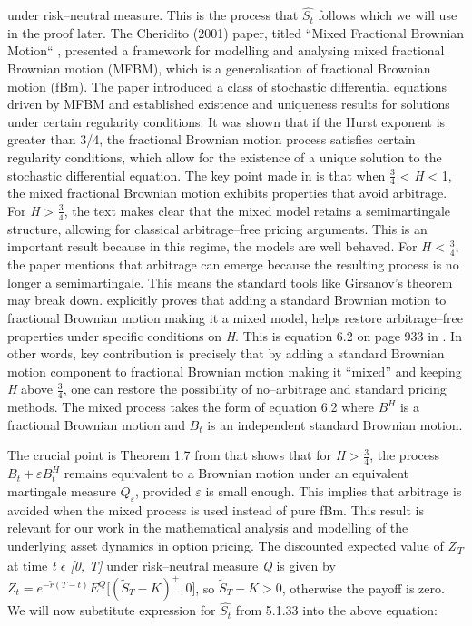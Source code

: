 \documentclass[12pt,a4paper]{report}
\numberwithin{equation}{section}
\begin{document}
under risk--neutral measure. This is the process that \(\widehat{S_{t}}\)
follows which we will use in the proof later. The Cheridito (2001)
paper, titled ``Mixed Fractional Brownian Motion`` \cite{cheridito2001mixed_107}, presented a
framework for modelling and analysing mixed fractional Brownian motion
(MFBM), which is a generalisation of fractional Brownian motion (fBm).
The paper introduced a class of stochastic differential equations driven
by MFBM and established existence and uniqueness results for solutions
under certain regularity conditions. It was shown that if the Hurst
exponent is greater than 3/4, the fractional Brownian motion process
satisfies certain regularity conditions, which allow for the existence
of a unique solution to the stochastic differential equation. The key
point made in \cite{cheridito2001mixed_107} is that when $\frac{3}{4}$ \textless{} \emph{H} \textless{}
1, the mixed fractional Brownian motion exhibits properties that avoid
arbitrage. For \emph{H} \textgreater{} $\frac{3}{4}$, the text makes clear that the
mixed model retains a semimartingale structure, allowing for classical
arbitrage--free pricing arguments. This is an important result because in
this regime, the models are well behaved. For \emph{H} \textless{} $\frac{3}{4}$,
the paper mentions that arbitrage can emerge because the resulting
process is no longer a semimartingale. This means the standard tools
like Girsanov's theorem may break down. \cite{cheridito2001mixed_107} explicitly proves that
adding a standard Brownian motion to fractional Brownian motion making
it a mixed model, helps restore arbitrage--free properties under specific
conditions on \emph{H}. This is equation 6.2 on page 933 in \cite{cheridito2001mixed_107}.
In other words, \cite{cheridito2001mixed_107} key contribution is precisely that by adding a
standard Brownian motion component to fractional Brownian motion making
it ``mixed'' and keeping \emph{H} above $\frac{3}{4}$, one can restore the
possibility of no--arbitrage and standard pricing methods. The mixed
process takes the form of equation 6.2 where \(B^{H}\) is a fractional
Brownian motion and \(B_{t}\) is an independent standard Brownian
motion.

The crucial point is Theorem 1.7 from \cite{cheridito2001mixed_107} that shows that for
\emph{H} \textgreater{} $\frac{3}{4}$, the process \(B_{t} + \varepsilon B_{t}^{H}\)
remains equivalent to a Brownian motion under an equivalent martingale
measure \(Q_{\varepsilon}\), provided $\varepsilon$ is small enough. This implies
that arbitrage is avoided when the mixed process is used instead of pure
fBm. This result is relevant for our work in the mathematical analysis
and modelling of the underlying asset dynamics in option pricing. The
discounted expected value of \emph{Z\textsubscript{T}} at time \emph{t $\epsilon$
{[}0, T{]}} under risk--neutral measure \emph{Q} is given by
\(Z_{t} = e^{- \widetilde{r}(T - t)}E^{Q}\lbrack\left( {\widetilde{S}}_{T} - K \right)^{+},0\rbrack\),
so \({\widetilde{S}}_{T} - K > 0\), otherwise the payoff is zero. We
will now substitute expression for \(\widehat{S_{t}}\) from 5.1.33 into
the above equation:
\end{document}
